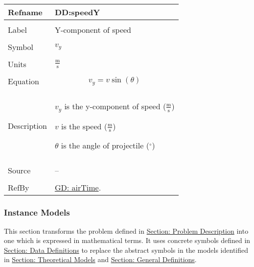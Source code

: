 \documentclass[12pt]{article}
\begin{document}
\noindent \begin{minipage}{\textwidth}
\begin{tabular}{p{} p{}}
\toprule \textbf{Refname} & \textbf{DD:speedY}
\label{DD:speedY}
\\ \midrule \\
Label & Y-component of speed
\\ \midrule \\
Symbol & ${v_{y}}$
\\ \midrule \\
Units & $\frac{\text{m}}{\text{s}}$
\\ \midrule \\
Equation & \begin{displaymath}
           {v_{y}}=v \sin\left(θ\right)
           \end{displaymath}
\\ \midrule \\
Description & \begin{symbDescription}
              \item{${v_{y}}$ is the y-component of speed ($\frac{\text{m}}{\text{s}}$)}
              \item{$v$ is the speed ($\frac{\text{m}}{\text{s}}$)}
              \item{$θ$ is the angle of projectile (${}^{\circ}$)}
              \end{symbDescription}
\\ \midrule \\
Source & --
\\ \midrule \\
RefBy & \hyperref[GD:airTime]{GD: airTime}.
\\ \bottomrule \end{tabular}
\end{minipage}
\subsubsection{Instance Models}
\label{Sec:IMs}
This section transforms the problem defined in \hyperref[Sec:ProbDesc]{Section: Problem Description} into one which is expressed in mathematical terms. It uses concrete symbols defined in \hyperref[Sec:DDs]{Section: Data Definitions} to replace the abstract symbols in the models identified in \hyperref[Sec:TMs]{Section: Theoretical Models} and \hyperref[Sec:GDs]{Section: General Definitions}.
\par~
\end{document}
